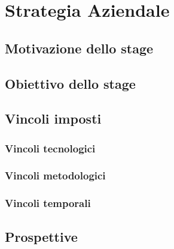 \section{Strategia Aziendale}
\subsection{Motivazione dello stage}

\subsection{Obiettivo dello stage}

\subsection{Vincoli imposti}
\subsubsection{Vincoli tecnologici}

\subsubsection{Vincoli metodologici}

\subsubsection{Vincoli temporali}

\subsection{Prospettive}
